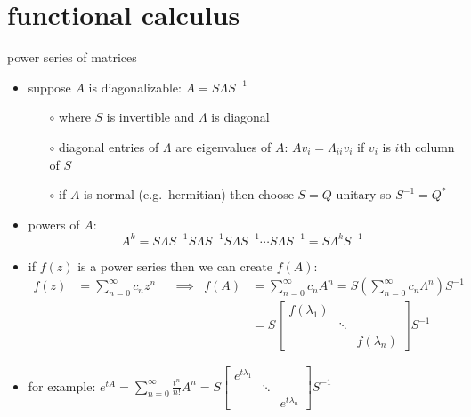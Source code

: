 \documentclass[10pt,hyperref]{beamer}
\begin{document}
\section{functional calculus}

\begin{frame}{power series of matrices}

\begin{itemize}
\item suppose $A$ is diagonalizable: $A = S \Lambda S^{-1}$
    \begin{itemize}
    \item[$\circ$] where $S$ is invertible and $\Lambda$ is diagonal
    \item[$\circ$] diagonal entries of $\Lambda$ are eigenvalues of $A$: $A v_i = \Lambda_{ii} v_i$ if $v_i$ is $i$th column of $S$
    \item[$\circ$] if $A$ is normal (e.g.~hermitian) then choose $S=Q$ unitary so $S^{-1}=Q^*$
    \end{itemize}
\item powers of $A$:
    $$A^k = S \Lambda S^{-1} S \Lambda S^{-1} S \Lambda S^{-1} \cdots S \Lambda S^{-1} = S \Lambda^k S^{-1}$$
\item if $f(z)$ is a power series then we can create $f(A)$:
\small
\begin{align*}
f(z) &= \sum_{n=0}^\infty c_n z^n & &\implies & f(A) &= \sum_{n=0}^\infty c_n A^n = S \left(\sum_{n=0}^\infty c_n \Lambda^n\right) S^{-1} \\
     &&&& &= S \begin{bmatrix} f(\lambda_1) & & \\ & \ddots & \\ & & f(\lambda_n) \end{bmatrix} S^{-1}
\end{align*}
\normalsize
\item for example: \qquad \small
$\displaystyle e^{tA} = \sum_{n=0}^\infty \frac{t^n}{n!} A^n =  S \begin{bmatrix} e^{t\lambda_1} & & \\ & \ddots & \\ & & e^{t\lambda_n} \end{bmatrix} S^{-1}$
\end{itemize}
\end{frame}
\end{document}
